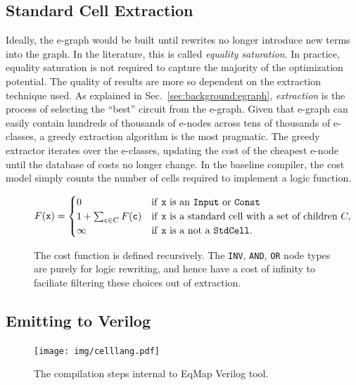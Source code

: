 \documentclass[10pt,letterpaper]{article}
\newcommand{\shortname}{EqMap}
\begin{document}
\subsection{Standard Cell Extraction}\label{sec:baseline:backend}
Ideally, the e-graph would be built until rewrites no longer introduce new
terms into the graph. In the literature, this is called \textit{equality
    saturation}. In practice, equality saturation is not required to capture the
majority of the optimization potential. The quality of results are more so
dependent on the extraction technique used. As explained in
Sec.~\ref{sec:background:egraph}, \textit{extraction} is the process of
selecting the ``best'' circuit from the e-graph. Given that e-graph can easily
contain hundreds of thousands of e-nodes across tens of thousands of e-classes,
a greedy extraction algorithm is the most pragmatic. The greedy extractor
iterates over the e-classes, updating the cost of the cheapest e-node until the
database of costs no longer change. In the baseline compiler, the cost model
simply counts the number of cells required to implement a logic function.

\begin{figure}[h]
    \[
        F(\texttt{x}) = \begin{cases}
            0                                         & \text{if \texttt{x} is an \texttt{Input} or \texttt{Const}}        \\
            1 + \sum_{\texttt{c} \in C} F(\texttt{c}) & \text{if \texttt{x} is a standard cell with a set of children } C, \\
            \infty                                    & \text{if \texttt{x} is a not a \texttt{StdCell}}.
        \end{cases}
    \]
    \caption{The cost function is defined recursively. The \texttt{INV}, \texttt{AND}, \texttt{OR} node types are purely for logic rewriting, and hence have a cost of infinity to faciliate filtering these choices out of extraction.}\label{fig:cost}
\end{figure}

\subsection{Emitting to Verilog}\label{sec:baseline:backend}

\begin{figure}
    \centering
    \texttt{[image: img/celllang.pdf]}
    \caption{The compilation steps internal to \shortname{} Verilog tool.}\label{fig:flow:egraph}
\end{figure}

\pagebreak
\nocite{*}


\end{document}
